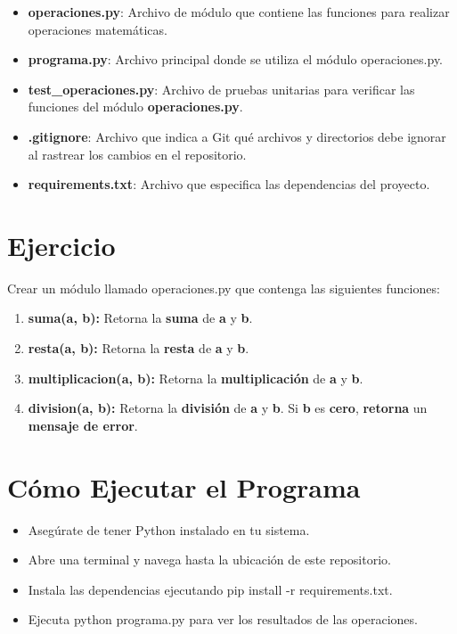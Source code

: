 \documentclass[
  a4paper,
  DIV=11,
  numbers=noendperiod,
  onepage,
  openany]{scrreprt}
\providecommand{\tightlist}{%
  \setlength{\itemsep}{0pt}\setlength{\parskip}{0pt}}\usepackage{longtable,booktabs,array}
\begin{document}
\begin{itemize}
\tightlist
\item
  \textbf{operaciones.py}: Archivo de módulo que contiene las funciones
  para realizar operaciones matemáticas.
\item
  \textbf{programa.py}: Archivo principal donde se utiliza el módulo
  operaciones.py.
\item
  \textbf{test\_operaciones.py}: Archivo de pruebas unitarias para
  verificar las funciones del módulo \textbf{operaciones.py}.
\item
  \textbf{.gitignore}: Archivo que indica a Git qué archivos y
  directorios debe ignorar al rastrear los cambios en el repositorio.
\item
  \textbf{requirements.txt}: Archivo que especifica las dependencias del
  proyecto.
\end{itemize}

\section{Ejercicio}\label{ejercicio}

Crear un módulo llamado operaciones.py que contenga las siguientes
funciones:

\begin{enumerate}
\def\labelenumi{\arabic{enumi}.}
\tightlist
\item
  \textbf{suma(a, b):} Retorna la \textbf{suma} de \textbf{a} y
  \textbf{b}.
\item
  \textbf{resta(a, b):} Retorna la \textbf{resta} de \textbf{a} y
  \textbf{b}.
\item
  \textbf{multiplicacion(a, b):} Retorna la \textbf{multiplicación} de
  \textbf{a} y \textbf{b}.
\item
  \textbf{division(a, b):} Retorna la \textbf{división} de \textbf{a} y
  \textbf{b}. Si \textbf{b} es \textbf{cero}, \textbf{retorna} un
  \textbf{mensaje de error}.
\end{enumerate}

\section{Cómo Ejecutar el Programa}\label{cuxf3mo-ejecutar-el-programa}

\begin{itemize}
\tightlist
\item
  Asegúrate de tener Python instalado en tu sistema.
\item
  Abre una terminal y navega hasta la ubicación de este repositorio.
\item
  Instala las dependencias ejecutando pip install -r requirements.txt.
\item
  Ejecuta python programa.py para ver los resultados de las operaciones.
\end{itemize}
\end{document}
